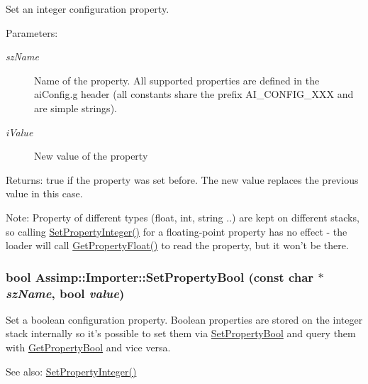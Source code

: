 Set an integer configuration property. \begin{Desc}
\item[Parameters:]
\begin{description}
\item[{\em szName}]Name of the property. All supported properties are defined in the aiConfig.g header (all constants share the prefix AI\_\-CONFIG\_\-XXX and are simple strings). \item[{\em iValue}]New value of the property \end{description}
\end{Desc}
\begin{Desc}
\item[Returns:]true if the property was set before. The new value replaces the previous value in this case. \end{Desc}
\begin{Desc}
\item[Note:]Property of different types (float, int, string ..) are kept on different stacks, so calling \hyperlink{class_assimp_1_1_importer_2542eed3d5f491025c4095b4e55fa068}{SetPropertyInteger()} for a floating-point property has no effect - the loader will call \hyperlink{class_assimp_1_1_importer_dfe1387ccc837fd59bf620e8216637fa}{GetPropertyFloat()} to read the property, but it won't be there. \end{Desc}
\hypertarget{class_assimp_1_1_importer_4af22a88eddf464d949a761149c72825}{
\subsubsection[SetPropertyBool]{\setlength{\rightskip}{0pt plus 5cm}bool Assimp::Importer::SetPropertyBool (const char $\ast$ {\em szName}, \/  bool {\em value})}}
\label{class_assimp_1_1_importer_4af22a88eddf464d949a761149c72825}


Set a boolean configuration property. Boolean properties are stored on the integer stack internally so it's possible to set them via \hyperlink{class_assimp_1_1_importer_4af22a88eddf464d949a761149c72825}{SetPropertyBool} and query them with \hyperlink{class_assimp_1_1_importer_90f5d35d25e5d2a0ef8bc0c6545b2010}{GetPropertyBool} and vice versa. \begin{Desc}
\item[See also:]\hyperlink{class_assimp_1_1_importer_2542eed3d5f491025c4095b4e55fa068}{SetPropertyInteger()} \end{Desc}


